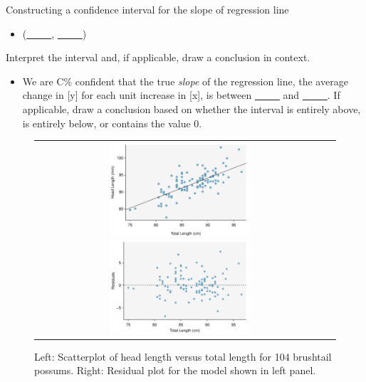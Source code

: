 \begin{onebox}{Constructing a confidence interval for the slope of regression line}
\begin{itemize}
\begin{itemize}
\end{itemize}
\item[] (\underline{\ \ \ \ \ }, \underline{\ \ \ \ \ })
\end{itemize}
  Interpret the interval and, if applicable, draw a conclusion in context.\vspace{-1mm}
\begin{itemize}
\item[] We are C\%  confident that the true \emph{slope} of the regression line, the average change in [y] for each unit increase in [x], is between \underline{\ \ \ \ \ } and \underline{\ \ \ \ \ }. If applicable, draw a conclusion based on whether the interval is entirely above, is entirely below, or contains the value 0. 
\end{itemize}
\end{onebox}

\begin{figure}%
   \centering
  \begin{tabular}{cc}
   \includegraphics[width=0.5\textwidth]{ch_regr_simple_linear/figures/possumInference/possumScatter}
   \includegraphics[width=0.5\textwidth]{ch_regr_simple_linear/figures/possumInference/possumResidual}
\end{tabular}
   \caption{Left: Scatterplot of head length versus total length for 104 brushtail possums.   Right: Residual plot for the model shown in left panel.  }
\label{possumInferencePlots}
\end{figure}

